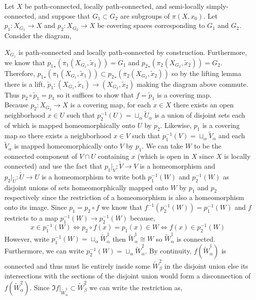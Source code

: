 \documentclass[12pt]{extarticle}
\begin{document}
Let $X$ be path-connected, locally path-connected, and semi-locally simply-connected, and suppose that $G_1 \subset G_2$ are subgroups of $\pi(X, x_0)$. Let $p_1 : X_{G_1} \to X$ and $p_2 : X_{G_2} \to X$ be covering spaces corresponding to $G_1$ and $G_2$. Consider the diagram,
\begin{center}
\end{center} 
$X_{G_1}$ is path-connected and locally path-connected by construction. Furthermore, we know that ${p_1}_*(\pi_1(X_{G_1}, \tilde{x}_1)) = G_1$ and ${p_2}_*(\pi_2(X_{G_2}, \tilde{x}_2)) = G_2$. Therefore, ${p_1}_*(\pi_1(X_{G_1}, \tilde{x}_1)) \subset {p_2}_*(\pi_2(X_{G_2}, \tilde{x}_2))$ so by the lifting lemma there is a lift, 
$\tilde{p}_1 : (X_{G_1}, \tilde{x}_1) \to (X_{G_2}, \tilde{x}_2)$ making the diagram above commute. Thus $p_2 \circ \tilde{p}_1 = p_1$ so it suffices to show that $f = \tilde{p}_1$ is a covering map. 
\bigskip\\
Because $p_2 : X_{G_2} \to X$ is a covering map, for each $x \in X$ there exists an open neighborhood $x \in U$ such that $p_2^{-1}(U) = \sqcup_{\alpha} \tilde{U}_{\alpha}$ is a union of disjoint sets each of which is mapped homeomorphically onto $U$ by $p_2$. Likewise, $p_1$ is a covering map so there exists a neighborhood $x \in V$ such that $p_1^{-1}(V) = \sqcup_{\alpha} \tilde{V}_{\alpha}$ and each $\tilde{V}_{\alpha}$ is mapped homeomorphically onto $V$ by $p_1$. We can take $W$ to be the connected component of $V \cap U$ containing $x$ (which is open in $X$ since $X$ is locally connected) and use the fact that $p_1 |_{\tilde{V}} : \tilde{V} \to V$ is a homeomorphism and $p_2 |_{\tilde{U}} : \tilde{U} \to U$ is a homeomorphism to write both $p_1^{-1}(W)$ and $p_2^{-1}(W)$ as disjoint unions of sets homeomorphically mapped onto $W$ by $p_1$ and $p_2$ respectively since the restriction of a homeomorphism is also a homeomorphism onto its image. Since $p_1 = p_2 \circ f$ we know that $f^{-1}(p_2^{-1}(W)) = p_1^{-1}(W)$ and $f$ restricts to a map $p_1^{-1}(W) \to p_2^{-1}(W)$ because,
\[x \in p_1^{-1}(W) \iff p_2 \circ f(x)= p_1(x) \in W \iff f(x) \in p_2^{-1}(W) \]
However, write $p_1^{-1}(W) = \sqcup_{\alpha} \tilde{W}^1_{\alpha}$ then $\tilde{W}_{\alpha}^1 \cong W$ so $\tilde{W}_{\alpha}^1$ is connected. Furthermore, we can write $p_2^{-1}(W) = \sqcup_{\alpha} \tilde{W}^2_{\alpha}$. By continuity, $f(\tilde{W}^1_{\alpha})$ is connected and thus must lie entirely inside some $\tilde{W}_{\beta}^2$ in the disjoint union else its intersections with the sections of the disjoint union would form a disconnection of $f(\tilde{W}_{\alpha}^2)$. Since $\Im{f|_{\tilde{W}^2_{\alpha}}} \subset \tilde{W}^2_{\beta}$ we can write the restriction as, 
\end{document}
